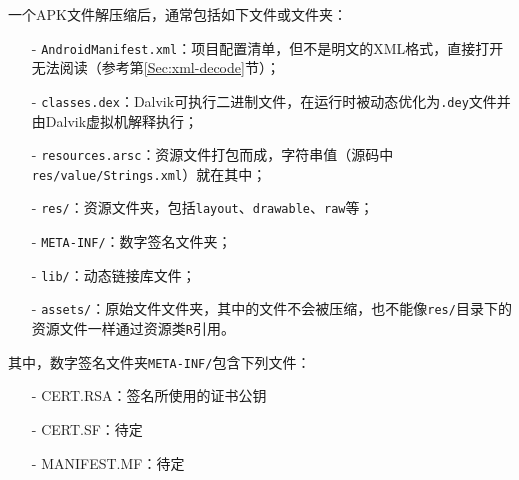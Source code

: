 一个APK文件解压缩后，通常包括如下文件或文件夹：
\begin{itemize}
  \item[-] \lstinline!AndroidManifest.xml!：项目配置清单，但不是明文的XML格式，直接打开无法阅读（参考第\ref{Sec:xml-decode}节）；
  \item[-] \lstinline!classes.dex!：Dalvik可执行二进制文件，在运行时被动态优化为\lstinline!.dey!文件并由Dalvik虚拟机解释执行；
  \item[-] \lstinline!resources.arsc!：资源文件打包而成，字符串值（源码中\lstinline!res/value/Strings.xml!）就在其中；
  \item[-] \lstinline!res/!：资源文件夹，包括\lstinline!layout!、\lstinline!drawable!、\lstinline!raw!等；
  \item[-] \lstinline!META-INF/!：数字签名文件夹；
  \item[-] \lstinline!lib/!：动态链接库文件；
  \item[-] \lstinline!assets/!：原始文件文件夹，其中的文件不会被压缩，也不能像\lstinline!res/!目录下的资源文件一样通过资源类\lstinline!R!引用。
\end{itemize}
其中，数字签名文件夹\lstinline!META-INF/!包含下列文件：
\begin{itemize}
  \item[-] CERT.RSA：签名所使用的证书公钥
  \item[-] CERT.SF：待定
  \item[-] MANIFEST.MF：待定
\end{itemize}
